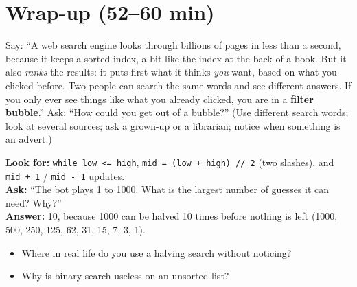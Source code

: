 \section{Wrap-up (52--60 min)}

\begin{safety}
Say: \enquote{A web search engine looks through billions of pages in less than a second, because it keeps a sorted index, a bit like the index at the back of a book. But it also \emph{ranks} the results: it puts first what it thinks \emph{you} want, based on what you clicked before. Two people can search the same words and see different answers. If you only ever see things like what you already clicked, you are in a \textbf{filter bubble}.} Ask: \enquote{How could you get out of a bubble?} (Use different search words; look at several sources; ask a grown-up or a librarian; notice when something is an advert.)
\end{safety}

\begin{formativecheck}
\textbf{Look for:} \texttt{while low <= high}, \texttt{mid = (low + high) // 2} (two slashes), and \texttt{mid + 1} / \texttt{mid - 1} updates.\\
\textbf{Ask:} \enquote{The bot plays 1 to 1000. What is the largest number of guesses it can need? Why?}\\
\textbf{Answer:} 10, because 1000 can be halved 10 times before nothing is left (1000, 500, 250, 125, 62, 31, 15, 7, 3, 1).
\end{formativecheck}

\begin{reflection}
\begin{itemize}[itemsep=1pt]
  \item Where in real life do you use a halving search without noticing?
  \item Why is binary search useless on an unsorted list?
\end{itemize}
\end{reflection}

